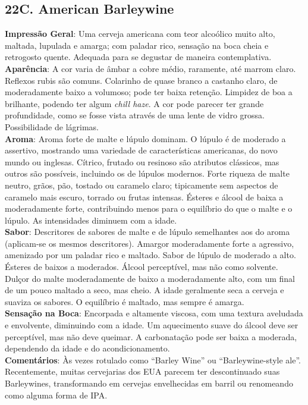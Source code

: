 \subsection*{22C. American Barleywine}
\textbf{Impressão Geral}: Uma cerveja americana com teor alcoólico muito alto, maltada, lupulada e amarga; com paladar rico, sensação na boca cheia e retrogosto quente. Adequada para se degustar de maneira contemplativa. \\
\textbf{Aparência}: A cor varia de âmbar a cobre médio, raramente, até marrom claro. Reflexos rubis são comuns. Colarinho de quase branco a castanho claro, de moderadamente baixo a volumoso; pode ter baixa retenção. Limpidez de boa a brilhante, podendo ter algum \textit{chill haze}. A cor pode parecer ter grande profundidade, como se fosse vista através de uma lente de vidro grossa. Possibilidade de lágrimas. \\
\textbf{Aroma}: Aroma forte de malte e lúpulo dominam. O lúpulo é de moderado a assertivo, mostrando uma variedade de características americanas, do novo mundo ou inglesas. Cítrico, frutado ou resinoso são atributos clássicos, mas outros são possíveis, incluindo os de lúpulos modernos. Forte riqueza de malte neutro, grãos, pão, tostado ou caramelo claro; tipicamente sem aspectos de caramelo mais escuro, torrado ou frutas intensas. Ésteres e álcool de baixa a moderadamente forte, contribuindo menos para o equilíbrio do que o malte e o lúpulo. As intensidades diminuem com a idade. \\
\textbf{Sabor}: Descritores de sabores de malte e de lúpulo semelhantes aos do aroma (aplicam-se os mesmos descritores). Amargor moderadamente forte a agressivo, amenizado por um paladar rico e maltado. Sabor de lúpulo de moderado a alto. Ésteres de baixos a moderados. Álcool perceptível, mas não como solvente. Dulçor do malte moderadamente de baixo a moderadamente alto, com um final de um pouco maltado a seco, mas cheio. A idade geralmente seca a cerveja e suaviza os sabores. O equilíbrio é maltado, mas sempre é amarga. \\
\textbf{Sensação na Boca}: Encorpada e altamente viscosa, com uma textura aveludada e envolvente, diminuindo com a idade. Um aquecimento suave do álcool deve ser perceptível, mas não deve queimar. A carbonatação pode ser baixa a moderada, dependendo da idade e do acondicionamento. \\
\textbf{Comentários}: Às vezes rotulado como “Barley Wine” ou “Barleywine-style ale”. Recentemente, muitas cervejarias dos EUA parecem ter descontinuado suas Barleywines, transformando em cervejas envelhecidas em barril ou renomeando como alguma forma de IPA. \\
